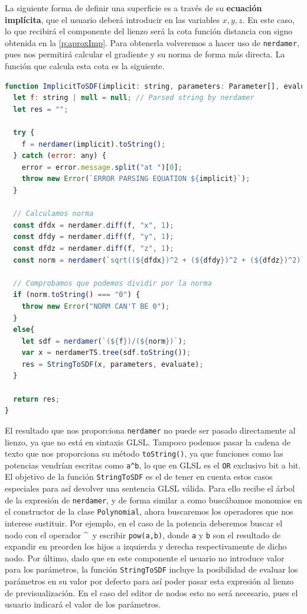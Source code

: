 La siguiente forma de definir una superficie es a través de su \textbf{ecuación implícita}, que el usuario deberá introducir en las variables $x,y,z$. En este caso, lo que recibirá el componente del lienzo será la cota función distancia con signo obtenida en la \autoref{p:aproxImp}. Para obtenerla volveremos a hacer uso de \texttt{nerdamer}, pues nos permitirá calcular el gradiente y su norma de forma más directa. La función que calcula esta cota es la siguiente.
\begin{lstlisting}[language=JavaScript, caption=Obtención de cota de ecuación implícita]
function ImplicitToSDF(implicit: string, parameters: Parameter[], evaluate: boolean = false) : string{
  let f: string | null = null; // Parsed string by nerdamer
  let res = "";

  try {
    f = nerdamer(implicit).toString();
  } catch (error: any) {
    error = error.message.split("at ")[0];
    throw new Error(`ERROR PARSING EQUATION ${implicit}`);
  }

  // Calculamos norma
  const dfdx = nerdamer.diff(f, "x", 1);
  const dfdy = nerdamer.diff(f, "y", 1);
  const dfdz = nerdamer.diff(f, "z", 1);
  const norm = nerdamer(`sqrt((${dfdx})^2 + (${dfdy})^2 + (${dfdz})^2)`);

  // Comprobamos que podemos dividir por la norma
  if (norm.toString() === "0") {
    throw new Error("NORM CAN'T BE 0");
  }
  else{
    let sdf = nerdamer(`(${f})/(${norm})`);
    var x = nerdamerTS.tree(sdf.toString());
    res = StringToSDF(x, parameters, evaluate);
  }

  return res;
}
\end{lstlisting}
El resultado que nos proporciona \texttt{nerdamer} no puede ser pasado directamente al lienzo, ya que no está en sintaxis GLSL. Tampoco podemos pasar la cadena de texto que nos proporciona su método \texttt{toString()}, ya que funciones como las potencias vendrían escritas como \texttt{a\textasciicircum b}, lo que en GLSL es el \texttt{OR} exclusivo bit a bit. El objetivo de la función \texttt{StringToSDF} es el de tener en cuenta estos casos especiales para así devolver una sentencia GLSL válida. Para ello recibe el árbol de la expresión de \texttt{nerdamer}, y de forma similar a como buscábamos monomios en el constructor de la clase \texttt{Polynomial}, ahora buscaremos los operadores que nos interese sustituir. Por ejemplo, en el caso de la potencia deberemos buscar el nodo con el operador \textasciicircum\ y escribir \texttt{pow(a,b)}, donde \texttt{a} y \texttt{b} son el resultado de expandir en preorden los hijos a izquierda y derecha respectivamente de dicho nodo. Por último, dado que en este componente el usuario no introduce valor para los parámetros, la función \texttt{StringToSDF} incluye la posibilidad de evaluar los parámetros en su valor por defecto para así poder pasar esta expresión al lienzo de previsualización. En el caso del editor de nodos esto no será necesario, pues el usuario indicará el valor de los parámetros.\newline

